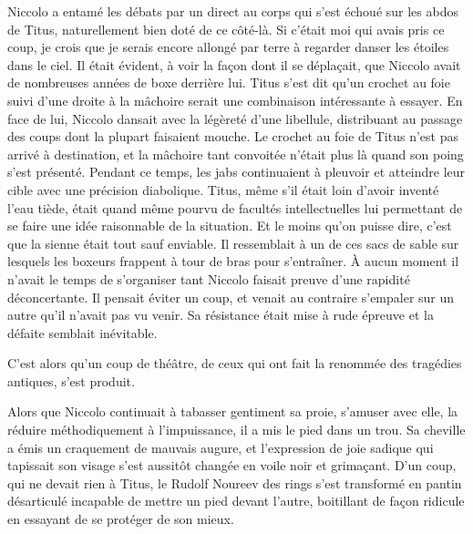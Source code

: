 Niccolo a entamé les débats par un direct au corps qui s’est échoué sur les abdos de Titus, naturellement bien doté de ce côté-là. Si c’était moi qui avais pris ce coup, je crois que je serais encore allongé par terre à regarder danser les étoiles dans le ciel. Il était évident, à voir la façon dont il se déplaçait, que Niccolo avait de nombreuses années de boxe derrière lui. Titus s’est dit qu’un crochet au foie suivi d’une droite à la mâchoire serait une combinaison intéressante à essayer. En face de lui, Niccolo dansait avec la légèreté d’une libellule, distribuant au passage des coups dont la plupart faisaient mouche. Le crochet au foie de Titus n’est pas arrivé à destination, et la mâchoire tant convoitée n’était plus là quand son poing s’est présenté. Pendant ce temps, les jabs continuaient à pleuvoir et atteindre leur cible avec une précision diabolique. Titus, même s’il était loin d’avoir inventé l’eau tiède, était quand même pourvu de facultés intellectuelles lui permettant de se faire une idée raisonnable de la situation. Et le moins qu’on puisse dire, c’est que la sienne était tout sauf enviable. Il ressemblait à un de ces sacs de sable sur lesquels les boxeurs frappent à tour de bras pour s’entraîner. À aucun moment il n’avait le temps de s’organiser tant Niccolo faisait preuve d’une rapidité déconcertante. Il pensait éviter un coup, et venait au contraire s’empaler sur un autre qu’il n’avait pas vu venir. Sa résistance était mise à rude épreuve et la défaite semblait inévitable.

C’est alors qu’un coup de théâtre, de ceux qui ont fait la renommée des tragédies antiques, s’est produit.

%
%
%
Alors que Niccolo continuait à tabasser gentiment sa proie, s’amuser avec elle, la réduire méthodiquement à l’impuissance, il a mis le pied dans un trou. Sa cheville a émis un craquement de mauvais augure, et l’expression de joie sadique qui tapissait son visage s’est aussitôt changée en voile noir et grimaçant. D’un coup, qui ne devait rien à Titus, le Rudolf Noureev des rings s’est transformé en pantin désarticulé incapable de mettre un pied devant l’autre, boitillant de façon ridicule en essayant de se protéger de son mieux.

